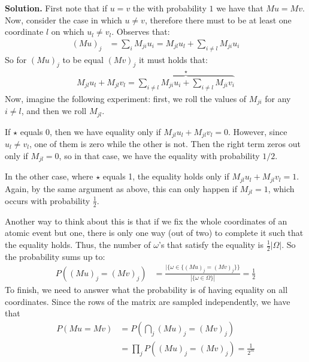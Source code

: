 \begin{enumerate}
  \textbf{Solution.} First note that if $u=v$ the with probability $1$ we have that $Mu = Mv$. Now, consider the case in which $u\neq v$, therefore there must to be at least one coordinate $l$ on which $u_{l}\neq v_{l}$. Observes that: 
  \begin{equation*}
    \begin{split}
      (Mu)_{j} & = \sum_{i}M_{ji}u_{i} = M_{jl}u_{l} + \sum_{i\neq l }M_{ji}u_{i} 
    \end{split}
  \end{equation*}
  So for $(Mu)_{j}$ to be equal $(Mv)_{j}$ it must holds that: 
  \begin{equation*}
  \begin{split}
    M_{jl}u_{l} + M_{jl}v_{l}  = \overbrace{\sum_{i\neq l }M_{ji}u_{i} + \sum_{i\neq l }M_{ji}v_{i}}^{\star} 
    \end{split}
  \end{equation*}
  Now, imagine the following experiment: first, we roll the values of $M_{ji}$ for any $i\neq l$, and then we roll $M_{jl}$.

  If $\star$ equals 0, then we have equality only if $M_{jl}u_{l} + M_{jl}v_{l} =0$. However, since $u_{l} \neq v_{l}$, one of them is zero while the other is not. Then the right term zeros out only if $M_{jl} = 0$, so in that case, we have the equality with probability $1/2$.

  In the other case, where $\star$ equals 1, the equality holds only if $M_{jl}u_{l} + M_{jl}v_{l} =1$. Again, by the same argument as above, this can only happen if $M_{jl} = 1$, which occurs with probability $\frac{1}{2}$.

  Another way to think about this is that if we fix the whole coordinates of an atomic event but one, there is only one way (out of two) to complete it such that the equality holds. Thus, the number of $\omega$'s that satisfy the equality is $\frac{1}{2}|\Omega|$. So the probability sums up to: 
  \begin{equation*}
    \begin{split}
      P( (Mu)_{j} = (Mv)_{j}) &= \frac{| \{ \omega \in \{(Mu)_{j} = (Mv)_{j}\} \}}{ | \{ \omega \in \Omega \} | } = \frac{1}{2}
    \end{split}
  \end{equation*} 
To finish, we need to answer what the probability is of having equality on all coordinates. Since the rows of the matrix are sampled independently, we have that 
\begin{equation*}
    \begin{split}
      P( Mu = Mv) &= P( \bigcap_{j} (Mu)_{j} = (Mv)_{j})\\
      &= \prod_{j} P( (Mu)_{j} = (Mv)_{j}) = \frac{1}{2^{m}}
    \end{split}
  \end{equation*}
\fi
\end{enumerate}
